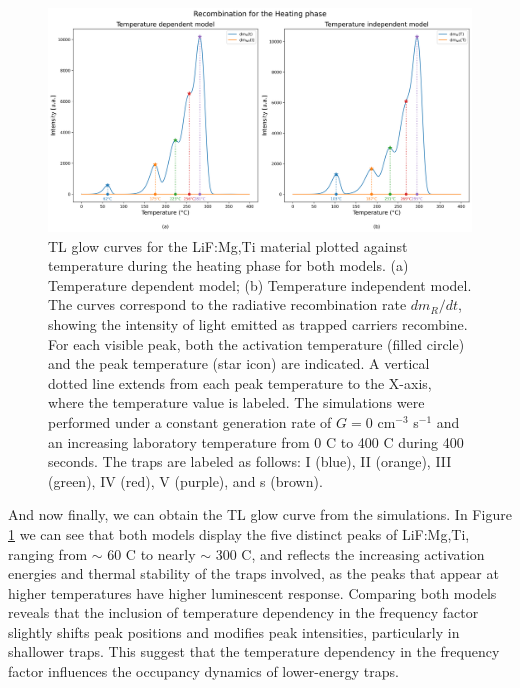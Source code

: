 \begin{figure}[H]
    \centering
    \includegraphics[width=\textwidth]{Images/GC_GlowCurve.png}
    \caption[Simulated TL glow curves for both models showing five main emission peaks.]{TL glow curves for the LiF:Mg,Ti material plotted against temperature during the heating phase for both models. (a) Temperature dependent model; (b) Temperature independent model. The curves correspond to the radiative recombination rate $dm_R/dt$, showing the intensity of light emitted as trapped carriers recombine. For each visible peak, both the activation temperature (filled circle) and the peak temperature (star icon) are indicated. A vertical dotted line extends from each peak temperature to the X-axis, where the temperature value is labeled. The simulations were performed under a constant generation rate of $G = 0$ cm$^{-3}$ s$^{-1}$ and an increasing laboratory temperature from 0 \textdegree C to 400 \textdegree C during 400 seconds. The traps are labeled as follows: I (blue), II (orange), III (green), IV (red), V (purple), and s (brown).}
    \label{fig:heating_TLGlowCurve}
\end{figure}

And now finally, we can obtain the TL glow curve from the simulations. In Figure \ref{fig:heating_TLGlowCurve} we can see that both models display the five distinct peaks of LiF:Mg,Ti, ranging from $\sim$ 60 \textdegree C to nearly $\sim$ 300 \textdegree C, and reflects the increasing activation energies and thermal stability of the traps involved, as the peaks that appear at higher temperatures have higher luminescent response. Comparing both models reveals that the inclusion of temperature dependency in the frequency factor slightly shifts peak positions and modifies peak intensities, particularly in shallower traps. This suggest that the temperature dependency in the frequency factor influences the occupancy dynamics of lower-energy traps. 

